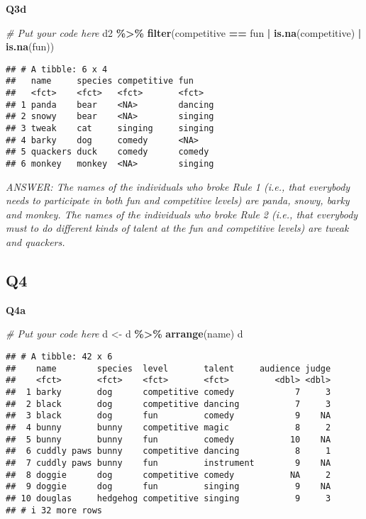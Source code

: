 \documentclass[
]{article}
\newenvironment{Shaded}{\begin{snugshade}}{\end{snugshade}}
\newcommand{\CommentTok}[1]{\textcolor[rgb]{0.56,0.35,0.01}{\textit{#1}}}
\newcommand{\FunctionTok}[1]{\textcolor[rgb]{0.13,0.29,0.53}{\textbf{#1}}}
\newcommand{\NormalTok}[1]{#1}
\newcommand{\OtherTok}[1]{\textcolor[rgb]{0.56,0.35,0.01}{#1}}
\newcommand{\SpecialCharTok}[1]{\textcolor[rgb]{0.81,0.36,0.00}{\textbf{#1}}}
\begin{document}
\textbf{Q3d}

\begin{Shaded}
\begin{Highlighting}[]
\CommentTok{\# Put your code here}
\NormalTok{d2 }\SpecialCharTok{\%\textgreater{}\%}
  \FunctionTok{filter}\NormalTok{(competitive }\SpecialCharTok{==}\NormalTok{ fun }\SpecialCharTok{|} \FunctionTok{is.na}\NormalTok{(competitive) }\SpecialCharTok{|} \FunctionTok{is.na}\NormalTok{(fun))}
\end{Highlighting}
\end{Shaded}

\begin{verbatim}
## # A tibble: 6 x 4
##   name     species competitive fun    
##   <fct>    <fct>   <fct>       <fct>  
## 1 panda    bear    <NA>        dancing
## 2 snowy    bear    <NA>        singing
## 3 tweak    cat     singing     singing
## 4 barky    dog     comedy      <NA>   
## 5 quackers duck    comedy      comedy 
## 6 monkey   monkey  <NA>        singing
\end{verbatim}

\emph{ANSWER: The names of the individuals who broke Rule 1 (i.e., that
everybody needs to participate in both fun and competitive levels) are
panda, snowy, barky and monkey. The names of the individuals who broke
Rule 2 (i.e., that everybody must to do different kinds of talent at the
fun and competitive levels) are tweak and quackers.}

\hypertarget{q4}{%
\subsection{Q4}\label{q4}}

\textbf{Q4a}

\begin{Shaded}
\begin{Highlighting}[]
\CommentTok{\# Put your code here}
\NormalTok{d }\OtherTok{\textless{}{-}}\NormalTok{ d }\SpecialCharTok{\%\textgreater{}\%}
  \FunctionTok{arrange}\NormalTok{(name)}
\NormalTok{d}
\end{Highlighting}
\end{Shaded}

\begin{verbatim}
## # A tibble: 42 x 6
##    name        species  level       talent     audience judge
##    <fct>       <fct>    <fct>       <fct>         <dbl> <dbl>
##  1 barky       dog      competitive comedy            7     3
##  2 black       dog      competitive dancing           7     3
##  3 black       dog      fun         comedy            9    NA
##  4 bunny       bunny    competitive magic             8     2
##  5 bunny       bunny    fun         comedy           10    NA
##  6 cuddly paws bunny    competitive dancing           8     1
##  7 cuddly paws bunny    fun         instrument        9    NA
##  8 doggie      dog      competitive comedy           NA     2
##  9 doggie      dog      fun         singing           9    NA
## 10 douglas     hedgehog competitive singing           9     3
## # i 32 more rows
\end{verbatim}
\end{document}
